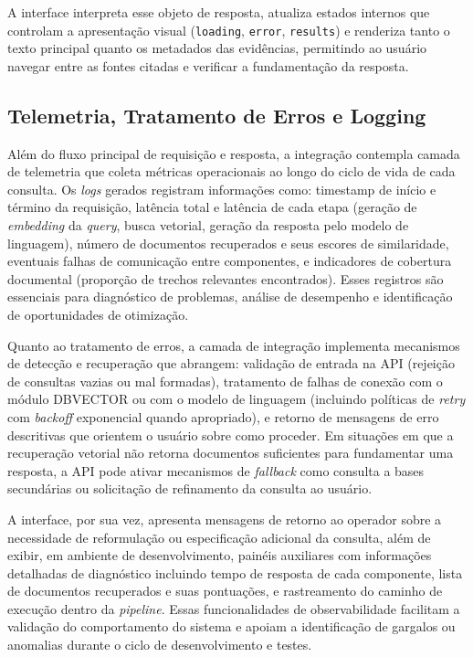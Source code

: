 A interface interpreta esse objeto de resposta, atualiza estados internos que controlam a apresentação visual (\texttt{loading}, \texttt{error}, \texttt{results}) e renderiza tanto o texto principal quanto os metadados das evidências, permitindo ao usuário navegar entre as fontes citadas e verificar a fundamentação da resposta.

\subsection{Telemetria, Tratamento de Erros e Logging}

Além do fluxo principal de requisição e resposta, a integração contempla camada de telemetria que coleta métricas operacionais ao longo do ciclo de vida de cada consulta. Os \textit{logs} gerados registram informações como: timestamp de início e término da requisição, latência total e latência de cada etapa (geração de \textit{embedding} da \textit{query}, busca vetorial, geração da resposta pelo modelo de linguagem), número de documentos recuperados e seus escores de similaridade, eventuais falhas de comunicação entre componentes, e indicadores de cobertura documental (proporção de trechos relevantes encontrados). Esses registros são essenciais para diagnóstico de problemas, análise de desempenho e identificação de oportunidades de otimização.

Quanto ao tratamento de erros, a camada de integração implementa mecanismos de detecção e recuperação que abrangem: validação de entrada na API (rejeição de consultas vazias ou mal formadas), tratamento de falhas de conexão com o módulo DBVECTOR ou com o modelo de linguagem (incluindo políticas de \textit{retry} com \textit{backoff} exponencial quando apropriado), e retorno de mensagens de erro descritivas que orientem o usuário sobre como proceder. Em situações em que a recuperação vetorial não retorna documentos suficientes para fundamentar uma resposta, a API pode ativar mecanismos de \textit{fallback} como consulta a bases secundárias ou solicitação de refinamento da consulta ao usuário.

A interface, por sua vez, apresenta mensagens de retorno ao operador sobre a necessidade de reformulação ou especificação adicional da consulta, além de exibir, em ambiente de desenvolvimento, painéis auxiliares com informações detalhadas de diagnóstico  incluindo tempo de resposta de cada componente, lista de documentos recuperados e suas pontuações, e rastreamento do caminho de execução dentro da \textit{pipeline}. Essas funcionalidades de observabilidade facilitam a validação do comportamento do sistema e apoiam a identificação de gargalos ou anomalias durante o ciclo de desenvolvimento e testes.

